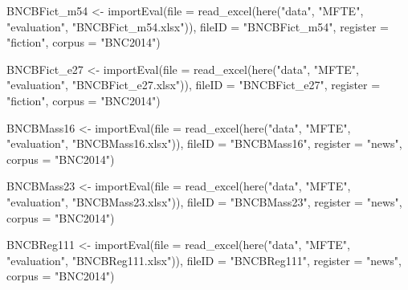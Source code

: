 \documentclass[
  letterpaper,
  DIV=11,
  numbers=noendperiod]{scrreprt}
\newenvironment{Shaded}{\begin{snugshade}}{\end{snugshade}}
\newcommand{\AttributeTok}[1]{\textcolor[rgb]{0.40,0.45,0.13}{#1}}
\newcommand{\FunctionTok}[1]{\textcolor[rgb]{0.28,0.35,0.67}{#1}}
\newcommand{\NormalTok}[1]{\textcolor[rgb]{0.00,0.23,0.31}{#1}}
\newcommand{\OtherTok}[1]{\textcolor[rgb]{0.00,0.23,0.31}{#1}}
\newcommand{\StringTok}[1]{\textcolor[rgb]{0.13,0.47,0.30}{#1}}
\begin{document}
\begin{Shaded}
\begin{Highlighting}[]
\NormalTok{BNCBFict\_m54 }\OtherTok{\textless{}{-}} \FunctionTok{importEval}\NormalTok{(}\AttributeTok{file =} \FunctionTok{read\_excel}\NormalTok{(}\FunctionTok{here}\NormalTok{(}\StringTok{"data"}\NormalTok{, }\StringTok{"MFTE"}\NormalTok{, }\StringTok{"evaluation"}\NormalTok{, }\StringTok{"BNCBFict\_m54.xlsx"}\NormalTok{)), }\AttributeTok{fileID =} \StringTok{"BNCBFict\_m54"}\NormalTok{, }\AttributeTok{register =} \StringTok{"fiction"}\NormalTok{, }\AttributeTok{corpus =} \StringTok{"BNC2014"}\NormalTok{)}

\NormalTok{BNCBFict\_e27 }\OtherTok{\textless{}{-}} \FunctionTok{importEval}\NormalTok{(}\AttributeTok{file =} \FunctionTok{read\_excel}\NormalTok{(}\FunctionTok{here}\NormalTok{(}\StringTok{"data"}\NormalTok{, }\StringTok{"MFTE"}\NormalTok{, }\StringTok{"evaluation"}\NormalTok{, }\StringTok{"BNCBFict\_e27.xlsx"}\NormalTok{)), }\AttributeTok{fileID =} \StringTok{"BNCBFict\_e27"}\NormalTok{, }\AttributeTok{register =} \StringTok{"fiction"}\NormalTok{, }\AttributeTok{corpus =} \StringTok{"BNC2014"}\NormalTok{)}

\NormalTok{BNCBMass16 }\OtherTok{\textless{}{-}} \FunctionTok{importEval}\NormalTok{(}\AttributeTok{file =} \FunctionTok{read\_excel}\NormalTok{(}\FunctionTok{here}\NormalTok{(}\StringTok{"data"}\NormalTok{, }\StringTok{"MFTE"}\NormalTok{, }\StringTok{"evaluation"}\NormalTok{, }\StringTok{"BNCBMass16.xlsx"}\NormalTok{)), }\AttributeTok{fileID =} \StringTok{"BNCBMass16"}\NormalTok{, }\AttributeTok{register =} \StringTok{"news"}\NormalTok{, }\AttributeTok{corpus =} \StringTok{"BNC2014"}\NormalTok{)}

\NormalTok{BNCBMass23 }\OtherTok{\textless{}{-}} \FunctionTok{importEval}\NormalTok{(}\AttributeTok{file =} \FunctionTok{read\_excel}\NormalTok{(}\FunctionTok{here}\NormalTok{(}\StringTok{"data"}\NormalTok{, }\StringTok{"MFTE"}\NormalTok{, }\StringTok{"evaluation"}\NormalTok{, }\StringTok{"BNCBMass23.xlsx"}\NormalTok{)), }\AttributeTok{fileID =} \StringTok{"BNCBMass23"}\NormalTok{, }\AttributeTok{register =} \StringTok{"news"}\NormalTok{, }\AttributeTok{corpus =} \StringTok{"BNC2014"}\NormalTok{)}

\NormalTok{BNCBReg111 }\OtherTok{\textless{}{-}} \FunctionTok{importEval}\NormalTok{(}\AttributeTok{file =} \FunctionTok{read\_excel}\NormalTok{(}\FunctionTok{here}\NormalTok{(}\StringTok{"data"}\NormalTok{, }\StringTok{"MFTE"}\NormalTok{, }\StringTok{"evaluation"}\NormalTok{, }\StringTok{"BNCBReg111.xlsx"}\NormalTok{)), }\AttributeTok{fileID =} \StringTok{"BNCBReg111"}\NormalTok{, }\AttributeTok{register =} \StringTok{"news"}\NormalTok{, }\AttributeTok{corpus =} \StringTok{"BNC2014"}\NormalTok{)}


\end{Highlighting}
\end{Shaded}
\end{document}
